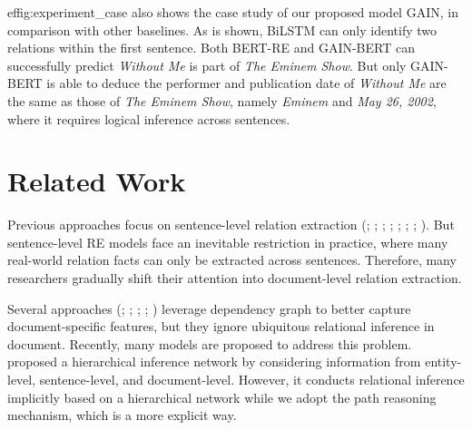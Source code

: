 \documentclass[11pt,a4paper]{article}
\begin{document}
                                                                                                                                                                                                                                                                                                                                                                                                                                                                                                                                                                ef{fig:experiment_case} also shows the case study of our proposed model GAIN, in comparison with other baselines. As is shown, BiLSTM can only identify two relations within the first sentence. 
Both BERT-RE and GAIN-BERT can successfully predict \textit{Without Me} is part of \textit{The Eminem Show}. But only GAIN-BERT is able to deduce the performer and publication date of \textit{Without Me} are the same as those of \textit{The Eminem Show}, namely \textit{Eminem} and \textit{May 26, 2002}, where it requires logical inference across sentences.

%
 \section{Related Work}
Previous approaches focus on sentence-level relation extraction (\citealp{zeng-etal-14-relation};
\citealp{zeng-etal-15-distant};
\citealp{wang-etal-16-relation}; \citealp{zhou-etal-16-attention}; \citealp{xiao-liu-16-semantic};
\citealp{zhang-etal-17-position};
\citealp{feng2018reinforcement}; \citealp{zhu-etal-19-graph}). But sentence-level RE models face an inevitable restriction in practice, where many real-world relation facts can only be extracted across sentences. Therefore, many researchers gradually shift their attention into document-level relation extraction.

Several approaches (\citealp{quirk-poon-17-distant}; \citealp{peng-etal-17-cross}; \citealp{DBLP:conf/aaai/GuptaRSR19}; \citealp{song-etal-2018}; \citealp{jia-etal-19-document}) leverage dependency graph to better capture document-specific features, but they ignore ubiquitous relational inference in document. 
Recently, many models are proposed to address this problem.
\citet{tang2020hin} proposed a hierarchical inference network by considering information from entity-level, sentence-level, and document-level. 
However, it conducts relational inference implicitly based on a hierarchical network while we adopt the path reasoning mechanism, which is a more explicit way.
\end{document}
